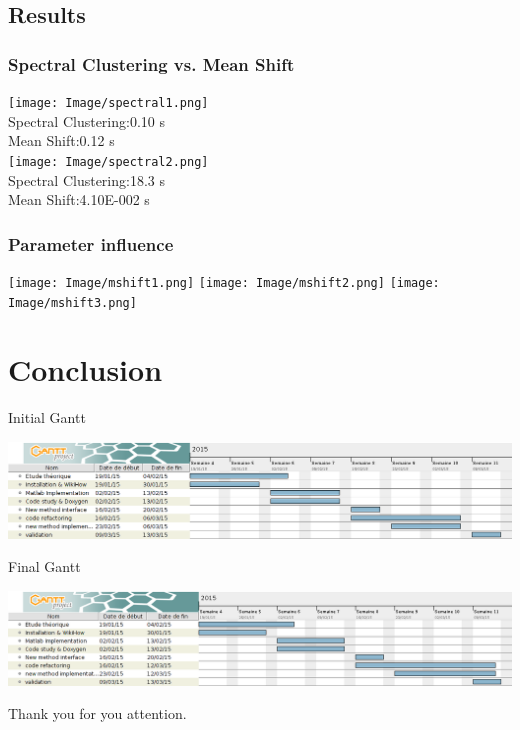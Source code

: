 \documentclass[10p]{beamer}
\newenvironment{changemargin}[2]{%
\begin{list}{}{%
\setlength{\topsep}{0pt}%
\setlength{\leftmargin}{#1}%
\setlength{\rightmargin}{#2}%
\setlength{\listparindent}{\parindent}%
\setlength{\itemindent}{\parindent}%
\setlength{\parsep}{\parskip}%
}%
\item[]}{\end{list}}
\begin{document}
\subsection{Results}
\begin{frame}[allowframebreaks]
\frametitle{Spectral Clustering vs. Mean Shift}
\texttt{[image: Image/spectral1.png]}\\
Spectral Clustering:0.10 s\\
Mean Shift:0.12 s\\
\texttt{[image: Image/spectral2.png]}\\
Spectral Clustering:18.3 s\\
Mean Shift:4.10E-002 s\\
\end{frame}
\begin{frame}
\frametitle{Parameter influence}
\texttt{[image: Image/mshift1.png]}
\texttt{[image: Image/mshift2.png]}
\texttt{[image: Image/mshift3.png]}
\end{frame}
\section{Conclusion}
\begin{frame}
\begin{itemize}
\item Initial Gantt
\begin{changemargin}{-1.2cm}{0cm}
\includegraphics[width=1.1\textwidth]{Image/gantt.png}
\end{changemargin}
\item Final Gantt
\begin{changemargin}{-1.2cm}{0cm}
\includegraphics[width=1.1\textwidth]{Image/gantt2.png}
\end{changemargin}
\end{itemize}
\end{frame}
\begin{frame}
\huge
\begin{center}
Thank you for you attention.
\end{center}
\end{frame}
\end{document}
